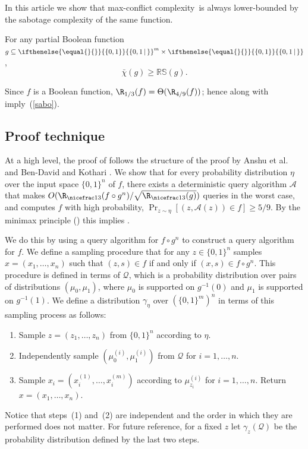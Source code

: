 \documentclass{toc}
\newcommand{\md}{\middle}
\newcommand{\dr}{\nicefrac}
\newcommand{\set}[2][]{\ifthenelse{\equal{}{#1}}%
{\ensuremath{\left\{#2\right\}}}%
{\ensuremath{\left\{#2\,\md|\,#1\right\}}}}
\newcommand{\OI}{\set{0,1}}
\newcommand{\clQ}{\mathcal{Q}}
\newcommand{\RS}{\mathbb{RS}}
\newcommand{\ccc}{max-conflict complexity}
\begin{document}
In this %
article  %
we show that \ccc\ is always lower-bounded by the sabotage complexity of the same function.

\begin{theorem}
\label{sabotage}
For any partial Boolean function
%
$g \subseteq \OI^m \times \OI$,
\[\bar \chi(g) \ge \RS(g).\]
\end{theorem}
Since $f$ is a Boolean function, $\R_{1/3}(f)=\Theta(\R_{4/9}(f))$; hence  along with  imply~(\ref{sabo}).
%
\subsection{Proof technique}
\label{idea}
At a high level, the proof of  follows the structure of the proof by Anshu et al.\ \cite{fstcomp} and Ben-David and Kothari \cite{DBLP:conf/icalp/Ben-DavidK16}. We show that for every probability distribution $\eta$ over the 
input space $\{0,1\}^n$ of $f$, there exists a deterministic query algorithm $\mathcal{A}$ that makes $O(\R_{\dr13}(f \circ g^n)/\sqrt{\R_{\dr13}(g)})$ queries in the worst case, and computes $f$ with high probability, $\Pr_{z \sim \eta} [(z,\mathcal{A}(z))\in f] \geq 5/9$. By the minimax principle () this implies .

We do this by using a query algorithm for $f \circ g^n$ to construct a query algorithm for $f$.  We define a sampling procedure that for any $z \in \{0,1\}^n$ samples $x=(x_1, \ldots, x_n)$ such that 
$(z,s) \in f$ if and only if $(x,s) \in f \circ g^n$.  This procedure is defined in terms of $\clQ$, which is a probability distribution over pairs of distributions $(\mu_0,\mu_1)$, where $\mu_0$ is supported on $g^{-1}(0)$ and $\mu_1$ is 
supported on $g^{-1}(1)$.  We define a distribution $\gamma_\eta$ over $(\{0,1\}^m)^n$ in terms of this sampling process as follows:
\begin{enumerate}
\item Sample $z=(z_1, \ldots,z_n)$ from $\{0,1\}^n$ according to $\eta$.
\item Independently sample $(\mu_0^{(i)}, \mu_1^{(i)})$ from $\clQ$ for $i=1, \ldots, n$.
\item Sample $x_i=(x^{(1)}_i, \ldots, x^{(m)}_i)$ according to $\mu_{z_i}^{(i)}$ for $i=1,\ldots, n$.  Return $x=(x_1, \ldots, x_n)$.
\end{enumerate}
Notice that steps~(1) and~(2) are independent and the order in which they are performed does not matter.  For future reference, for a fixed $z$ let $\gamma_z(\clQ)$ be the probability distribution defined by the last two steps.  
\end{document}
